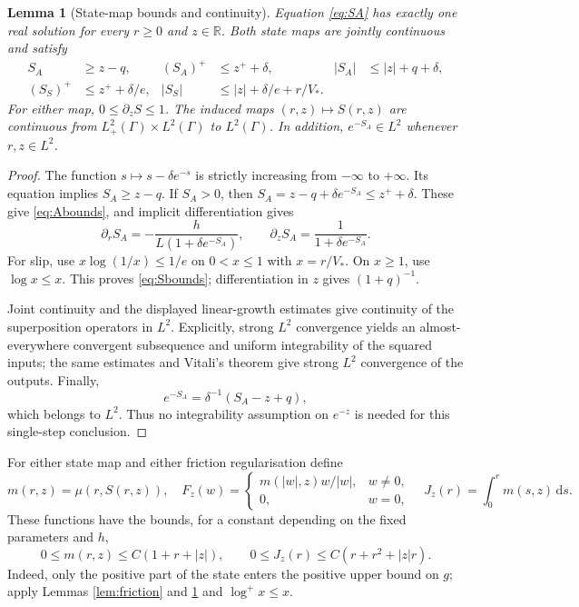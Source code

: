 \documentclass[11pt,a4paper]{article}
\newtheorem{lemma}[theorem]{Lemma}
\theoremstyle{definition}\newtheorem{definition}[theorem]{Definition}
\theoremstyle{remark}\newtheorem{remark}[theorem]{Remark}
\newcommand{\R}{\mathbb R}
\newcommand{\dd}{\,\mathrm d}
\numberwithin{equation}{section}
\begin{document}
\begin{lemma}[State-map bounds and continuity]\label{lem:state}
Equation \eqref{eq:SA} has exactly one real solution for every $r\ge0$ and $z\in\R$. Both state maps are jointly continuous and satisfy
\begin{align}
 S_A&\ge z-q,& (S_A)^+&\le z^++\delta,& |S_A|&\le|z|+q+\delta,\label{eq:Abounds}\\
 (S_S)^+&\le z^++\delta/e,&
 |S_S|&\le |z|+\delta/e+r/V_* .&&\label{eq:Sbounds}
\end{align}
For either map, $0\le\partial_zS\le1$. The induced maps $(r,z)\mapsto S(r,z)$ are continuous from $L^2_+(\Gamma)\times L^2(\Gamma)$ to $L^2(\Gamma)$. In addition, $e^{-S_A}\in L^2$ whenever $r,z\in L^2$.
\end{lemma}
\begin{proof}
The function $s\mapsto s-\delta e^{-s}$ is strictly increasing from $-\infty$ to $+\infty$. Its equation implies $S_A\ge z-q$. If $S_A>0$, then $S_A=z-q+\delta e^{-S_A}\le z^++\delta$. These give \eqref{eq:Abounds}, and implicit differentiation gives
\begin{equation}\label{eq:ageDerivatives}
 \partial_rS_A=-\frac{h}{L(1+\delta e^{-S_A})},\qquad
 \partial_zS_A=\frac1{1+\delta e^{-S_A}}.
\end{equation}
For slip, use $x\log(1/x)\le1/e$ on $0<x\le1$ with $x=r/V_*$. On $x\ge1$, use $\log x\le x$. This proves \eqref{eq:Sbounds}; differentiation in $z$ gives $(1+q)^{-1}$.

Joint continuity and the displayed linear-growth estimates give continuity of the superposition operators in $L^2$. Explicitly, strong $L^2$ convergence yields an almost-everywhere convergent subsequence and uniform integrability of the squared inputs; the same estimates and Vitali's theorem give strong $L^2$ convergence of the outputs. Finally,
\[
 e^{-S_A}=\delta^{-1}(S_A-z+q),
\]
which belongs to $L^2$. Thus no integrability assumption on $e^{-z}$ is needed for this single-step conclusion.
\end{proof}

For either state map and either friction regularisation define
\begin{equation}\label{eq:effective}
 m(r,z)=\mu(r,S(r,z)),\quad
 F_z(w)=\begin{cases}m(|w|,z)w/|w|,&w\ne0,\\0,&w=0,\end{cases}
 \quad J_z(r)=\int_0^r m(s,z)\dd s.
\end{equation}
These functions have the bounds, for a constant depending on the fixed parameters and $h$,
\begin{equation}\label{eq:growth}
 0\le m(r,z)\le C(1+r+|z|),\qquad
 0\le J_z(r)\le C(r+r^2+|z|r).
\end{equation}
Indeed, only the positive part of the state enters the positive upper bound on $g$; apply Lemmas \ref{lem:friction} and \ref{lem:state} and $\log^+x\le x$.
\end{document}
